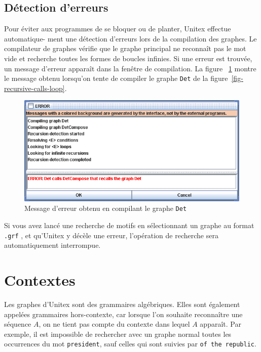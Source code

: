 \subsection{Détection d’erreurs}
Pour éviter aux programmes de se bloquer ou de planter, Unitex effectue automatique-
ment une détection d’erreurs lors de la compilation des graphes. Le compilateur de graphes
vérifie que le graphe principal ne reconnaît pas le mot vide et recherche toutes les formes de
boucles infinies. Si une erreur est trouvée, un message d’erreur apparaît dans la fenêtre de
compilation. La figure ~\ref{fig-error-message} montre le message obtenu lorsqu’on tente de 
compiler le graphe \verb+Det+ de la figure~\ref{fig-recursive-calls-loop}.

\begin{figure}[!ht]
\begin{center}
\includegraphics[width=15cm]{resources/img/fig6-11.png}
\caption{Message d’erreur obtenu en compilant le graphe
\texttt{Det}\label{fig-error-message}}
\end{center}
\end{figure}

\noindent Si vous avez lancé une recherche de motifs en sélectionnant un graphe au format 
\verb+.grf+ , et qu’Unitex y décèle une erreur, l’opération
de recherche sera automatiquement interrompue.


\section{Contextes}
\label{section-contexts}

Les graphes d’Unitex sont des grammaires algébriques. Elles sont également appelées
grammaires hors-contexte, car lorsque l’on souhaite reconnaître une séquence
 $A$, on ne tient pas compte du contexte dans lequel $A$ apparaît. Par exemple, il est 
 impossible de rechercher avec un graphe normal toutes les occurrences du mot \verb+president+, 
 sauf celles qui sont suivies par \verb+of the republic+.



